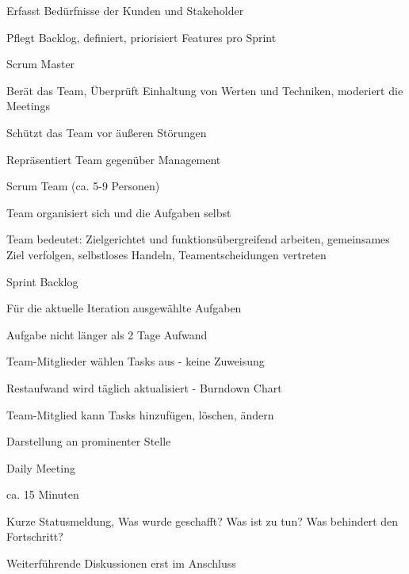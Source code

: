 \documentclass[a4paper]{article}
\begin{document}
\begin{multicols}{3}
\begin{itemize*}
\begin{itemize*}
      \begin{itemize*}
        \item Erfasst Bedürfnisse der Kunden und Stakeholder
        \item Pflegt Backlog, definiert, priorisiert Features pro Sprint
      \end{itemize*}
      \item Scrum Master
      \begin{itemize*}
        \item Berät das Team, Überprüft Einhaltung von Werten und Techniken, moderiert die Meetings
        \item Schützt das Team vor äußeren Störungen
        \item Repräsentiert Team gegenüber Management
      \end{itemize*}
      \item Scrum Team (ca. 5-9 Personen)
      \begin{itemize*}
        \item Team organisiert sich und die Aufgaben selbst
        \item Team bedeutet: Zielgerichtet und funktionsübergreifend arbeiten, gemeinsames Ziel verfolgen, selbstloses Handeln, Teamentscheidungen vertreten
      \end{itemize*}
    \end{itemize*}
  \end{itemize*}

  Sprint Backlog
  \begin{itemize*}
    \item Für die aktuelle Iteration ausgewählte Aufgaben
    \begin{itemize*}
      \item Aufgabe nicht länger als 2 Tage Aufwand
    \end{itemize*}
    \item Team-Mitglieder wählen Tasks aus - keine Zuweisung
    \item Restaufwand wird täglich aktualisiert - Burndown Chart
    \item Team-Mitglied kann Tasks hinzufügen, löschen, ändern
    \item Darstellung an prominenter Stelle
  \end{itemize*}

  Daily Meeting
  \begin{itemize*}
    \item ca. 15 Minuten
    \item Kurze Statusmeldung, Was wurde geschafft? Was ist zu tun? Was behindert den Fortschritt?
    \item Weiterführende Diskussionen erst im Anschluss
  \end{itemize*}


\end{multicols}
\end{document}
